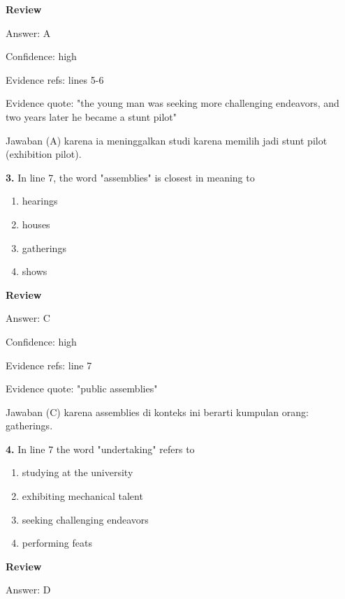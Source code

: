 \documentclass[12pt]{article}
\begin{document}
\par
\begingroup
\setlength{\parskip}{0pt}
\setlength{\parindent}{0pt}
\textbf{Review}\par
Answer: A\par
Confidence: high\par
Evidence refs: lines 5-6\par
Evidence quote: "the young man was seeking more challenging endeavors, and two years later he became a stunt pilot"\par
Jawaban (A) karena ia meninggalkan studi karena memilih jadi stunt pilot (exhibition pilot).\par
\endgroup
\par
\vspace{0.25\baselineskip}
\noindent\textbf{3.} In line 7, the word "assemblies" is closest in meaning to
\begin{enumerate}[label=(\Alph*),leftmargin=*,itemsep=0.2em]
\item hearings
\item houses
\item gatherings
\item shows
\end{enumerate}
\par
\begingroup
\setlength{\parskip}{0pt}
\setlength{\parindent}{0pt}
\textbf{Review}\par
Answer: C\par
Confidence: high\par
Evidence refs: line 7\par
Evidence quote: "public assemblies"\par
Jawaban (C) karena assemblies di konteks ini berarti kumpulan orang: gatherings.\par
\endgroup
\par
\vspace{0.25\baselineskip}
\noindent\textbf{4.} In line 7 the word "undertaking" refers to
\begin{enumerate}[label=(\Alph*),leftmargin=*,itemsep=0.2em]
\item studying at the university
\item exhibiting mechanical talent
\item seeking challenging endeavors
\item performing feats
\end{enumerate}
\par
\begingroup
\setlength{\parskip}{0pt}
\setlength{\parindent}{0pt}
\textbf{Review}\par
Answer: D\par
\end{document}
